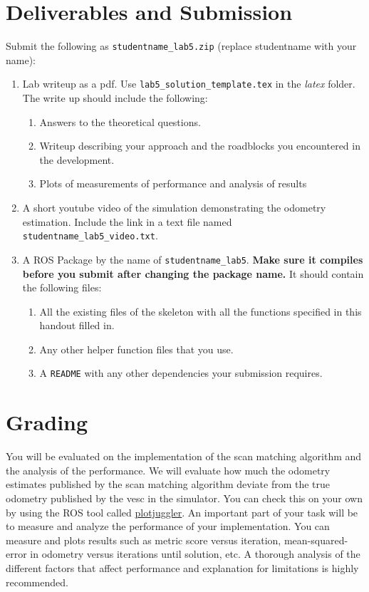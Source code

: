 \documentclass[letta4 paper]{article}
\numberwithin{equation}{section}
\newcommand{\0}{\mathbf{0}}
\begin{document}
	\section{Deliverables and Submission}
	Submit the following as \texttt{studentname\_lab5.zip} (replace studentname with your name):
	
	\begin{enumerate}
		\item Lab writeup as a pdf. Use \texttt{lab5\_solution\_template.tex} in the \textit{latex} folder. The write up should include the following:
		\begin{enumerate}
			\item Answers to the theoretical questions. 
			\item Writeup describing your approach and the roadblocks you encountered in the development.
			\item Plots of measurements of performance and analysis of results
		\end{enumerate}
		\item A short youtube video of the simulation demonstrating the odometry estimation. Include the link in a text file named \texttt{studentname\_lab5\_video.txt}.
		\item  A ROS Package by the name of \texttt{studentname\_lab5}. \textbf{Make sure it compiles before you submit after changing the package name.} It should contain the following files:
		\begin{enumerate}
			\item All the existing files of the skeleton with all the functions specified in this handout filled in.
			\item Any other helper function files that you use.
			\item A \texttt{README} with any other dependencies your submission requires.
		\end{enumerate}

	\end{enumerate}
	

	\section{Grading}
	You will be evaluated on the implementation of the scan matching algorithm and the analysis of the performance. We will evaluate how much the odometry estimates published by the scan matching algorithm deviate from the true odometry published by the vesc in the simulator. You can check this on your own by using the ROS tool called \href{http://wiki.ros.org/plotjuggler}{plotjuggler}. An important part of your task will be to measure and analyze the performance of your implementation. You can measure and plots results such as metric score versus iteration, mean-squared-error in odometry versus iterations until solution, etc. A thorough analysis of the different factors that affect performance and explanation for limitations is highly recommended.
	\newpage
\end{document}
